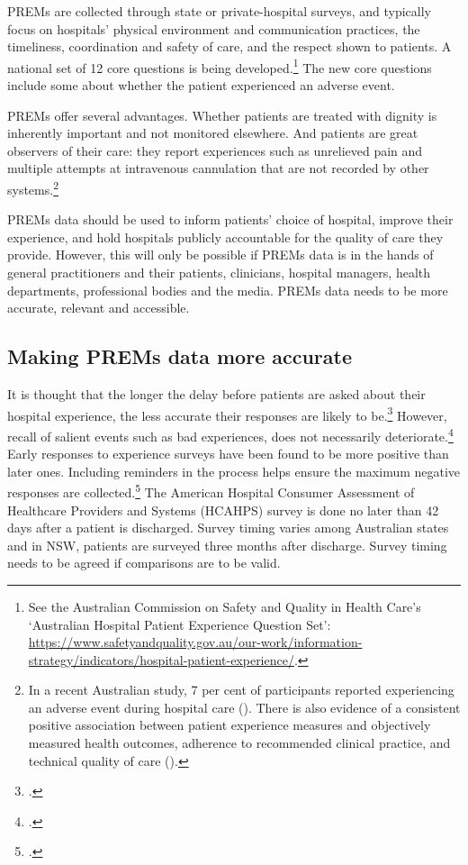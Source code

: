 \documentclass[FrontPage]{grattan}
\begin{document}
PREMs are collected through state or private-hospital surveys, and typically focus on hospitals’ physical environment and communication practices, the timeliness, coordination and safety of care, and the respect shown to patients. A national set of 12 core questions is being developed.\footnote{See the Australian Commission on Safety and Quality in Health Care's `Australian Hospital Patient Experience Question Set': \textcolor{blue}{\url{https://www.safetyandquality.gov.au/our-work/information-strategy/indicators/hospital-patient-experience/}}.}
The new core questions include some about whether the patient experienced an adverse event.

PREMs offer several advantages. Whether patients are treated with dignity is inherently important and not monitored elsewhere. And patients are great observers of their care: they report experiences such as unrelieved pain and multiple attempts at intravenous cannulation that are not recorded by other systems.\footnote{In a recent Australian study, 7 per cent of participants reported experiencing an adverse event during hospital care (\textcite{RN47}).
There is also evidence of a consistent positive association between patient experience measures and objectively measured health outcomes, adherence to recommended clinical practice, and technical quality of care (\textcites{RN51}{RN50}{price2014surveys}{RN48}).}

PREMs data should be used to inform patients’ choice of hospital, improve their experience, and hold hospitals publicly accountable for the quality of care they provide. However, this will only be possible if PREMs data is in the hands of general practitioners and their patients, clinicians, hospital managers, health departments, professional bodies and the media. PREMs data needs to be more accurate, relevant and accessible.

\subsection{Making PREMs data more accurate}\label{subsec:PREMsaccurate}

It is thought that the longer the delay before patients are asked about their hospital experience, the less accurate their responses are likely to be.\footcites{lavela2014evaluation}{RN50}
However, recall of salient events such as bad experiences, does not necessarily deteriorate.\footcite{kjellsson2014forgetting}
Early responses to experience surveys have been found to be more positive than later ones. Including reminders in the process helps ensure the maximum negative responses are collected.\footcites{barron2014takes}{bjertnaes2012association}
The American Hospital Consumer Assessment of Healthcare Providers and Systems (HCAHPS) survey is done no later than 42 days after a patient is discharged. Survey timing varies among Australian states and in NSW, patients are surveyed three months after discharge. Survey timing needs to be agreed if comparisons are to be valid.
\end{document}
